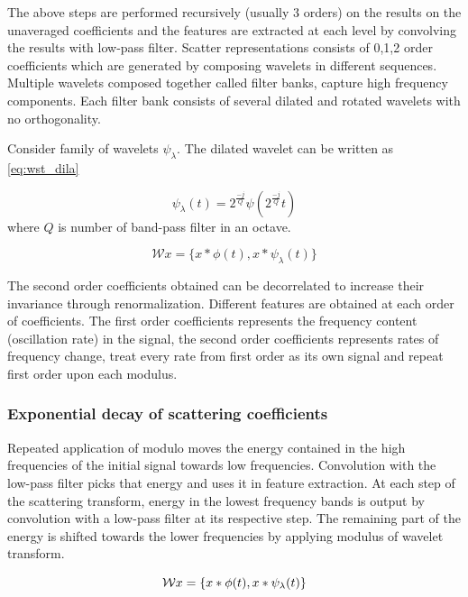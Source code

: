 The above steps are performed recursively (usually 3 orders) on the results on the unaveraged coefficients and the features are extracted at each level by convolving the results with low-pass filter. Scatter representations consists of {0,1,2} order coefficients which are generated by composing wavelets in different sequences. Multiple wavelets composed together called filter banks, capture high frequency components. Each filter bank consists of several dilated and rotated wavelets with no orthogonality.

Consider family of wavelets ${\psi_{\lambda}}$. The dilated wavelet can be written as \ref{eq:wst_dila}

\begin{equation} \label{eq:wst_dila}
    \psi_{\lambda}(t) = 2^{\frac{-j}{Q}}\psi(2^{\frac{-j}{Q}}t)
\end{equation}
where $Q$ is number of band-pass filter in an octave.

\begin{equation} \label{eq:wst_wt}
    \mathcal{W} x = \{x\ast \phi(t) , x\ast \psi_\lambda(t) \}
\end{equation}

The second order coefficients obtained can be decorrelated to increase their invariance through renormalization. Different features are obtained at each order of coefficients. The first order coefficients represents the frequency content (oscillation rate) in the signal, the second order coefficients represents rates of frequency change, treat every rate from first order as its own signal and repeat first order upon each modulus. 

 \subsubsection{Exponential decay of scattering coefficients}
 Repeated application of modulo moves the energy contained in the high frequencies of the initial signal towards low frequencies. Convolution with the low-pass filter picks that energy and uses it in  feature extraction. At each step of the scattering transform, energy in the lowest frequency bands is output by convolution with a low-pass filter at its respective step. The remaining part of the energy is shifted towards the lower frequencies by applying modulus of wavelet transform.
 
 \begin{equation} \label{eq:wst_wt1}
    \mathcal{W} x = \{x\ast \phi(t) , x\ast \psi_\lambda(t) \} \\
\end{equation}

